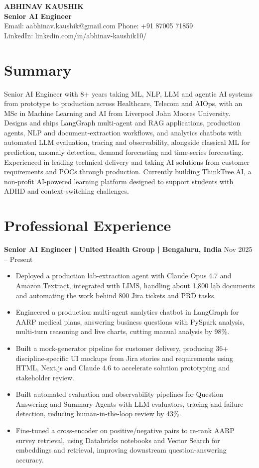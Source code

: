 \documentclass[10pt,a4paper]{article}
\newcommand{\role}[2]{\textbf{#1} \hfill #2\par}
\begin{document}
\begin{center}
  {\Large\bfseries ABHINAV KAUSHIK}\\[1pt]
  \textbf{Senior AI Engineer}\\[1pt]
  Email: aabhinav.kaushik@gmail.com \quad Phone: +91 87005 71859\\
  LinkedIn: linkedin.com/in/abhinav-kaushik10/
\end{center}

\section{Summary}
Senior AI Engineer with 8+ years taking ML, NLP, LLM and agentic AI systems from prototype to production across Healthcare,
Telecom and AIOps, with an MSc in Machine Learning and AI from Liverpool John Moores University. Designs and ships
LangGraph multi-agent and RAG applications, production agents, NLP and document-extraction workflows, and analytics chatbots
with automated LLM evaluation, tracing and observability, alongside classical ML for prediction, anomaly detection, demand forecasting and time-series
forecasting. Experienced in leading technical delivery and taking AI solutions from customer requirements and POCs through
production. Currently building ThinkTree.AI, a non-profit AI-powered learning platform designed to support students with ADHD
and context-switching challenges.

\section{Professional Experience}
\role{Senior AI Engineer | United Health Group | Bengaluru, India}{Nov 2025 -- Present}
\begin{itemize}
  \item Deployed a production lab-extraction agent with Claude Opus 4.7 and Amazon Textract, integrated with LIMS,
  handling about 1,800 lab documents and automating the work behind 800 Jira tickets and PRD tasks.
  \item Engineered a production multi-agent analytics chatbot in LangGraph for AARP medical plans, answering business
  questions with PySpark analysis, multi-turn reasoning and live charts, cutting manual analysis by 98\%.
  \item Built a mock-generator pipeline for customer delivery, producing 36+ discipline-specific UI mockups from Jira
  stories and requirements using HTML, Next.js and Claude 4.6 to accelerate solution prototyping and stakeholder review.
  \item Built automated evaluation and observability pipelines for Question Answering and Summary Agents with LLM
  evaluators, tracing and failure detection, reducing human-in-the-loop review by 43\%.
  \item Fine-tuned a cross-encoder on positive/negative pairs to re-rank AARP survey retrieval, using Databricks
  notebooks and Vector Search for embeddings and retrieval, improving downstream question-answering accuracy.
\end{itemize}
\vspace{3pt}
\end{document}
